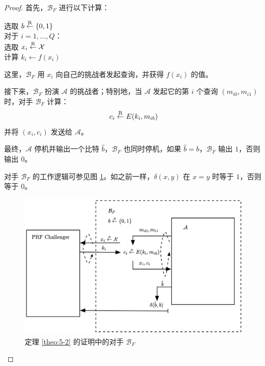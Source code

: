 \begin{proof}
\hspace*{5pt} 首先，$\mathcal{B}_F$ 进行以下计算：

\vspace{5pt}

\hspace*{28.5pt} 选取 $b\overset{\rm R}\leftarrow\{0,1\}$\\
\hspace*{50pt} 对于 $i=1,\dots,Q$：\\
\hspace*{50pt} 选取 $x_i\overset{\rm R}\leftarrow\mathcal{X}$\\
\hspace*{50pt} 计算 $k_i\leftarrow f(x_i)$

\vspace{8pt}

\hspace*{5pt} 这里，$\mathcal{B}_F$ 用 $x_i$ 向自己的挑战者发起查询，并获得 $f(x_i)$ 的值。

\vspace{3pt}

\hspace*{5pt} 接下来，$\mathcal{B}_F$ 扮演 $\mathcal{A}$ 的挑战者；特别地，当 $\mathcal{A}$ 发起它的第 $i$ 个查询 $(m_{i0},m_{i1})$ 时，对手 $\mathcal{B}_F$ 计算：
	\[c_i\overset{\rm R}\leftarrow E(k_i,m_{ib})\]
\hspace*{26pt} 并将 $(x_i,c_i)$ 发送给 $\mathcal{A}$。

\vspace{5pt}
    
\hspace*{5pt} 最终，$\mathcal{A}$ 停机并输出一个比特 $\hat{b}$，$\mathcal{B}_F$ 也同时停机，如果 $\hat{b}=b$，$\mathcal{B}_F$ 输出 $1$，否则输出 $0$。

\vspace{5pt}

\noindent
对手 $\mathcal{B}_F$ 的工作逻辑可参见图 \ref{fig:5-1}。如之前一样，$\delta(x,y)$ 在 $x=y$ 时等于 $1$，否则等于 $0$。

\begin{figure}
  \centering
  \includegraphics[width=0.8\linewidth]{figures/chapter5/fig1.png}
  \caption{定理 \ref{theo:5-2} 的证明中的对手 $\mathcal{B}_F$}
  \label{fig:5-1}
\end{figure}


\end{proof}
